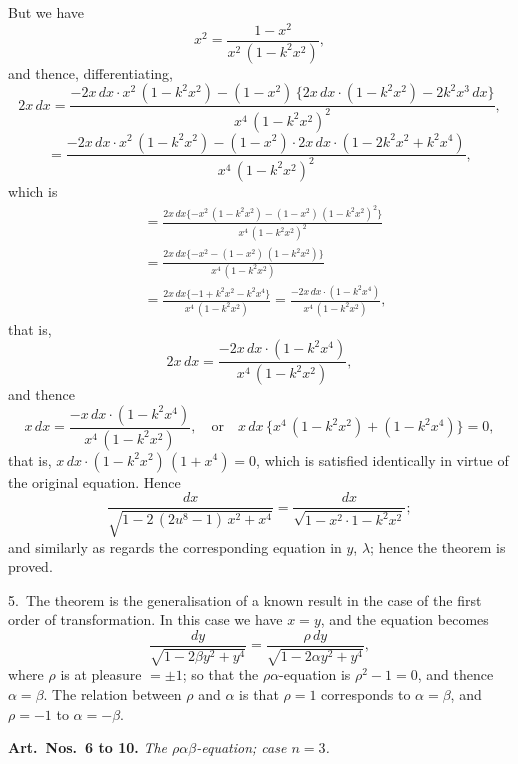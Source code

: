 \documentclass[12pt,a4paper]{article}
\theoremstyle{definition}
\begin{document}
But we have
\[
x^2 = \frac{1 - x^2}{x^2\, (1 - k^2 x^2)},
\]
and thence, differentiating,
\[
2x\, dx
= \frac{-2x\, dx \cdot x^2\, (1 - k^2 x^2) - (1 - x^2)\, \{2x\, dx \cdot (1 - k^2 x^2) - 2k^2 x^3\, dx\}}
{x^4\, (1 - k^2 x^2)^2},
\]
\[
= \frac{-2x\, dx \cdot x^2\, (1 - k^2 x^2) - (1 - x^2) \cdot 2x\, dx \cdot (1 - 2k^2 x^2 + k^2 x^4)}
{x^4\, (1 - k^2 x^2)^2},
\]
which is
\begin{align*}
&= \frac{2x\, dx \{-x^2\, (1 - k^2 x^2) - (1 - x^2)\, (1 - k^2 x^2)^2\}}
{x^4\, (1 - k^2 x^2)^2}\\
&= \frac{2x\, dx \{-x^2 - (1 - x^2)\, (1 - k^2 x^2)\}}{x^4\, (1 - k^2 x^2)}\\
&= \frac{2x\, dx \{-1 + k^2 x^2 - k^2 x^4\}}{x^4\, (1 - k^2 x^2)}
= \frac{-2x\, dx \cdot (1 - k^2 x^4)}{x^4\, (1 - k^2 x^2)},
\end{align*}
that is,
\[
2x\, dx = \frac{-2x\, dx \cdot (1 - k^2 x^4)}{x^4\, (1 - k^2 x^2)},
\]
and thence
\[
x\, dx = \frac{-x\, dx \cdot (1 - k^2 x^4)}{x^4\, (1 - k^2 x^2)},
\quad \text{or} \quad x\, dx\, \{x^4\, (1 - k^2 x^2) + (1 - k^2 x^4)\} = 0,
\]
that is, $x\, dx \cdot (1 - k^2 x^2)\, (1 + x^4) = 0$, which is satisfied identically in virtue of the
original equation. Hence
\[
\frac{dx}{\sqrt{1 - 2\, (2u^8 - 1)\, x^2 + x^4}}
= \frac{dx}{\sqrt{1 - x^2 \cdot 1 - k^2 x^2}};
\]
and similarly as regards the corresponding equation in $y$, $\lambda$; hence the theorem is proved.

5.\ The theorem is the generalisation of a known result in the case of the first
order of transformation. In this case we have $x = y$, and the equation becomes
\[
\frac{dy}{\sqrt{1 - 2\beta y^2 + y^4}}
= \frac{\rho\, dy}{\sqrt{1 - 2\alpha y^2 + y^4}},
\]
where $\rho$ is at pleasure $= \pm 1$; so that the $\rho\alpha$-equation is $\rho^2 - 1 = 0$, and thence
$\alpha = \beta$. The relation between $\rho$ and $\alpha$ is that $\rho = 1$ corresponds to $\alpha = \beta$,
and $\rho = -1$ to $\alpha = -\beta$.

\newpage
\noindent\textbf{Art.\ Nos.\ 6 to 10.} \textit{The $\rho\alpha\beta$-equation; case $n=3$.}
\end{document}
